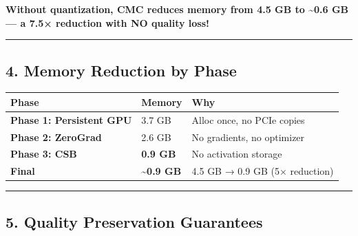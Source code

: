 \documentclass[
  11pt,
  a4paper,
]{article}
\begin{document}
\textbf{Without quantization, CMC reduces memory from 4.5 GB to
\textasciitilde0.6 GB --- a 7.5× reduction with NO quality loss!}

\begin{center}\rule{0.5\linewidth}{0.5pt}\end{center}

\subsection{4. Memory Reduction by
Phase}\label{memory-reduction-by-phase}

\begin{longtable}[]{@{}lll@{}}
\toprule\noalign{}
Phase & Memory & Why \\
\midrule\noalign{}
\endhead
\bottomrule\noalign{}
\endlastfoot
\textbf{Phase 1: Persistent GPU} & 3.7 GB & Alloc once, no PCIe
copies \\
\textbf{Phase 2: ZeroGrad} & 2.6 GB & No gradients, no optimizer \\
\textbf{Phase 3: CSB} & \textbf{0.9 GB} & No activation storage \\
\textbf{Final} & \textbf{\textasciitilde0.9 GB} & 4.5 GB → 0.9 GB (5×
reduction) \\
\end{longtable}

\begin{center}\rule{0.5\linewidth}{0.5pt}\end{center}

\subsection{5. Quality Preservation
Guarantees}\label{quality-preservation-guarantees}
\end{document}
